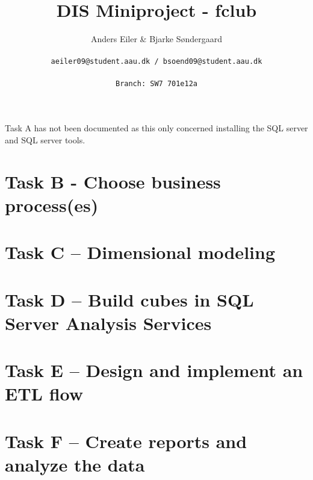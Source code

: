 \documentclass[a4paper,10pt]{article}
\title{DIS Miniproject - fclub}
\author{Anders Eiler \& Bjarke Søndergaard \\
\rule{0pt}{4ex}\texttt{aeiler09@student.aau.dk / bsoend09@student.aau.dk} \\
\rule{0pt}{4ex}\texttt{Branch: SW7 701e12a}}
\begin{document}
    \maketitle
    \newpage
    
    Task A has not been documented as this only concerned installing the SQL server and SQL server tools.

    \section{Task B - Choose business process(es)}
    
    
    \section{Task C – Dimensional modeling}
    

    \section{Task D – Build cubes in SQL Server Analysis Services}
    

    \section{Task E – Design and implement an ETL flow}
    

    \section{Task F – Create reports and analyze the data}
    
\end{document}
